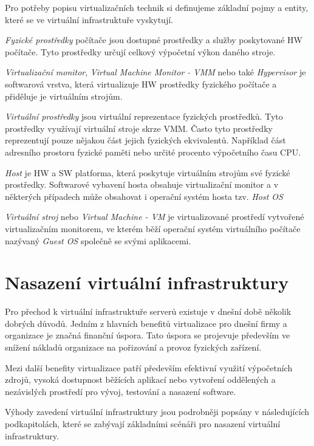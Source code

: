   Pro potřeby popisu virtualizačních technik si definujeme základní pojmy a entity, které se ve virtuální infrastruktuře vyskytují.

  \textit{Fyzické prostředky} počítače jsou dostupné prostředky a služby poskytované HW počítače. Tyto prostředky určují celkový výpočetní výkon daného stroje.

  \textit{Virtualizační monitor}, \textit{Virtual Machine Monitor - VMM} nebo také \textit{Hypervisor} je softwarová vrstva, která virtualizuje HW prostředky fyzického počítače a přiděluje je
  virtuálním strojům.

  \textit{Virtuální prostředky} jsou virtuální reprezentace fyzických prostředků. Tyto prostředky využívají virtuální stroje skrze VMM. Často tyto prostředky reprezentují pouze nějakou část jejich
  fyzických ekvivalentů. Například část adresního prostoru fyzické paměti nebo určité procento výpočetního času CPU.

  \textit{Host} je HW a SW platforma, která poskytuje virtuálním strojům své fyzické prostředky. Softwarové vybavení hosta obsahuje virtualizační
  monitor a v některých případech může obsahovat i operační systém hosta tzv. \textit{Host OS}

  \textit{Virtuální stroj} nebo \textit{Virtual Machine - VM} je virtualizované prostředí vytvořené virtualizačním monitorem, ve kterém běží operační systém virtuálního počítače nazývaný \textit{Guest OS} společně
  se svými aplikacemi.


\section{Nasazení virtuální infrastruktury}
\label{section:vm_deployment}

Pro přechod k virtuální infrastruktuře serverů existuje v dnešní době několik dobrých důvodů. Jedním z hlavních benefitů virtualizace pro dnešní firmy a organizace je značná finanční úspora. Tato úspora se
projevuje především ve snížení nákladů organizace na pořizování a provoz fyzických zařízení. 

Mezi další benefity virtualizace patří především efektivní využití výpočetních zdrojů, vysoká dostupnost běžících aplikací nebo vytvoření oddělených a nezávislých prostředí pro vývoj, testování a nasazení software.

Výhody zavedení virtuální infrastruktury jsou podrobněji popsány v následujících podkapitolách, které se zabývají základními scénáři pro nasazení virtuální infrastruktury.

